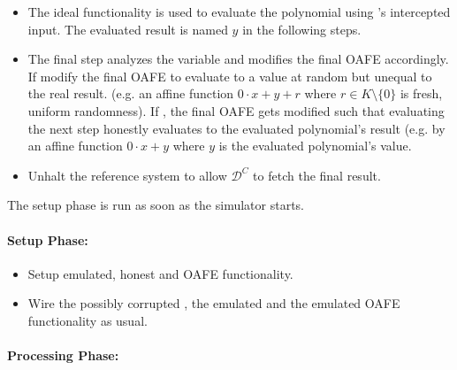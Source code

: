 \begin{itemize}

  \item The ideal functionality is used to evaluate the polynomial using
    \JWpTwo{}'s intercepted input. The evaluated result is named $y$ in the
    following steps.

  \item The final step analyzes the variable  and modifies the
    final OAFE accordingly. If  modify the final OAFE
    to evaluate to a value at random but unequal to the real result. (e.g. an
    affine function $0 \cdot x + y + r$ where $r \in K \setminus \{0\}$ is
    fresh, uniform randomness). If , the final OAFE
    gets modified such that evaluating the next step honestly evaluates to the
    evaluated polynomial's result (e.g. by an affine function $0 \cdot x + y$
    where $y$ is the evaluated polynomial's value.

  \item Unhalt the reference system to allow $\mathcal{D}^C$ to fetch the final
    result.

\end{itemize}


\label{sec:simulator-goliath}

The setup phase is run as soon as the simulator starts.

\paragraph{Setup Phase:}

\begin{itemize}

  \item Setup emulated, honest \JWpTwo{} and OAFE functionality.

  \item Wire the possibly corrupted \JWpOne{}, the emulated \JWpTwo{} and the
    emulated OAFE functionality as usual.

\end{itemize}

\paragraph{Processing Phase:}

